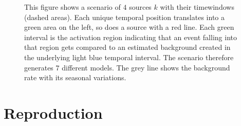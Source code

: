 \begin{figure}
{}
  \caption{This figure shows a scenario of $\num{4}$ sources $k$ with their timewindows (dashed areas). Each unique temporal position translates into a green area on the left, so does a source with a red line. Each green interval is the activation region indicating that an event falling into that region gets compared to an estimated background created in the underlying light blue temporal interval. The scenario therefore generates $\num{7}$ different models. The grey line shows the background rate with its seasonal variations.}
  \label{fig:activation}
\end{figure}

\chapter{Reproduction}
